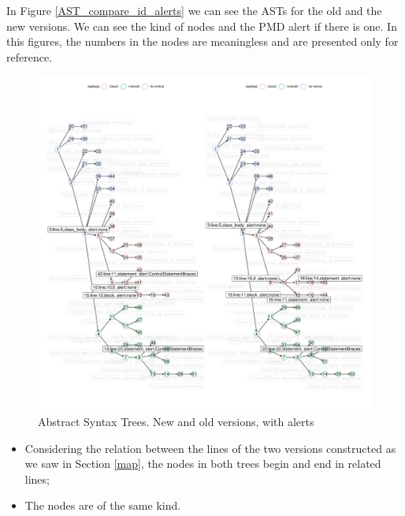 \documentclass[
]{article}
\begin{document}
In Figure \ref{AST_compare_id_alerts} we can see the ASTs for the old
and the new versions. We can see the kind of nodes and the PMD alert if
there is one. In this figures, the numbers in the nodes are meaningless
and are presented only for reference.

\small

\begin{figure}[H]
\includegraphics[width=.8\linewidth]{report_files/figure-latex/unnamed-chunk-2-1} \caption{Abstract Syntax Trees. New and old versions, with alerts \label{AST_compare_id_alerts}}\label{fig:unnamed-chunk-2}
\end{figure}

\normalsize

\begin{itemize}
\item
  Considering the relation between the lines of the two versions constructed as we saw in Section \ref{map}, the nodes in both trees begin and end in related lines;

\item
  The nodes are of the same kind.
\end{itemize}

\small
\end{document}
